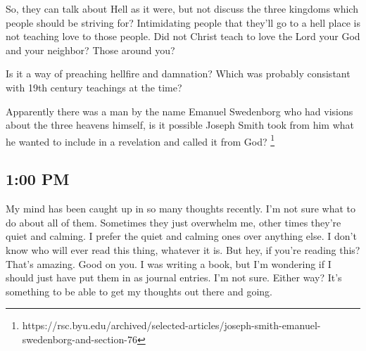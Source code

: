 So, they can talk about Hell as it were, but not discuss the three kingdoms which
people should be striving for? Intimidating people that they'll go to a hell place 
is not teaching love to those people. Did not Christ teach to love the Lord your God
and your neighbor? Those around you?

Is it a way of preaching hellfire and damnation? Which was probably consistant with
19th century teachings at the time?

Apparently there was a man by the name Emanuel Swedenborg who had visions about the
three heavens himself, is it possible Joseph Smith took from him what he wanted to
include in a revelation and called it from God?
\footnote{https://rsc.byu.edu/archived/selected-articles/joseph-smith-emanuel-swedenborg-and-section-76}

\subsection{1:00 PM}

My mind has been caught up in so many thoughts recently. I'm not sure what to do
about all of them. Sometimes they just overwhelm me, other times they're quiet and
calming. I prefer the quiet and calming ones over anything else. I don't know who
will ever read this thing, whatever it is. But hey, if you're reading this? That's
amazing. Good on you. I was writing a book, but I'm wondering if I should just have
put them in as journal entries. I'm not sure. Either way? It's something to be able
to get my thoughts out there and going.